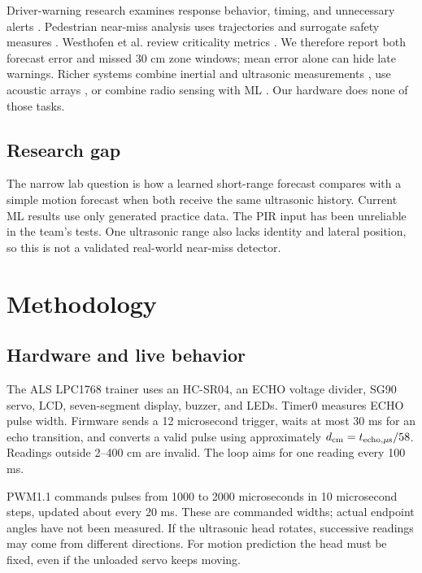 \documentclass[conference]{IEEEtran}
\begin{document}
Driver-warning research examines response behavior, timing, and unnecessary alerts \cite{shao2023,bao2024,xie2024,fu2025,olufowobi2025,xu2024,yang2025}. Pedestrian near-miss analysis uses trajectories and surrogate safety measures \cite{ahsan2024}. Westhofen et al. review criticality metrics \cite{westhofen2023}. We therefore report both forecast error and missed 30 cm zone windows; mean error alone can hide late warnings. Richer systems combine inertial and ultrasonic measurements \cite{hybrid2024}, use acoustic arrays \cite{izquierdo2024}, or combine radio sensing with ML \cite{cardenas2024}. Our hardware does none of those tasks.
\subsection{Research gap}
The narrow lab question is how a learned short-range forecast compares with a simple motion forecast when both receive the same ultrasonic history. Current ML results use only generated practice data. The PIR input has been unreliable in the team's tests. One ultrasonic range also lacks identity and lateral position, so this is not a validated real-world near-miss detector.
\section{Methodology}
\subsection{Hardware and live behavior}
The ALS LPC1768 trainer uses an HC-SR04, an ECHO voltage divider, SG90 servo, LCD, seven-segment display, buzzer, and LEDs. Timer0 measures ECHO pulse width. Firmware sends a 12 microsecond trigger, waits at most 30 ms for an echo transition, and converts a valid pulse using approximately $d_{\rm cm}=t_{\rm echo,\mu s}/58$. Readings outside 2--400 cm are invalid. The loop aims for one reading every 100 ms.

PWM1.1 commands pulses from 1000 to 2000 microseconds in 10 microsecond steps, updated about every 20 ms. These are commanded widths; actual endpoint angles have not been measured. If the ultrasonic head rotates, successive readings may come from different directions. For motion prediction the head must be fixed, even if the unloaded servo keeps moving.
\end{document}
